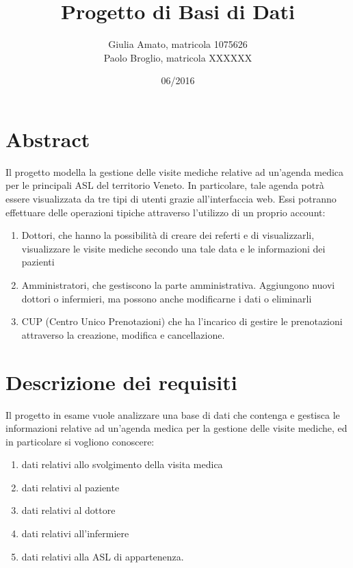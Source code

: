 \documentclass{report}
\begin{document}
\title{\textbf{Progetto di Basi di Dati}}
\author{Giulia Amato, matricola 1075626
\\Paolo Broglio, matricola XXXXXX}
\date{06/2016}
\maketitle
\section*{Abstract}
Il progetto modella la gestione delle visite mediche relative ad un'agenda medica per le principali ASL del territorio Veneto. In particolare, tale agenda potrà essere visualizzata da tre tipi di utenti grazie all'interfaccia web. Essi potranno effettuare delle operazioni tipiche attraverso l'utilizzo di un proprio account:
\begin{enumerate}
\item  Dottori, che hanno la possibilità di creare dei referti e di visualizzarli, visualizzare le visite mediche secondo una tale data e le informazioni dei pazienti
\item Amministratori, che gestiscono la parte amministrativa. Aggiungono nuovi dottori o infermieri, ma possono anche modificarne i dati o eliminarli
\item CUP (Centro Unico Prenotazioni) che ha l'incarico di gestire le prenotazioni attraverso la creazione, modifica e cancellazione.
\end{enumerate}


\section*{Descrizione dei requisiti}
Il progetto in esame vuole analizzare una base di dati che contenga e gestisca le informazioni relative ad un'agenda medica per la gestione delle visite mediche, ed in particolare si vogliono conoscere:
\begin{enumerate}
 \item dati relativi allo svolgimento della visita medica
 \item dati relativi al paziente
 \item dati relativi al dottore
 \item dati relativi all'infermiere
 \item dati relativi alla ASL di appartenenza.
 \end{enumerate} 
\end{document}

